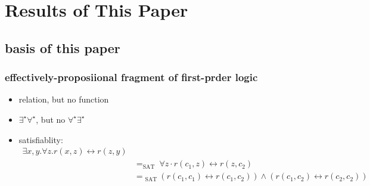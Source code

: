\section{Results of This Paper}
\subsection{basis of this paper}
\begin{frame}
    \frametitle{effectively-proposiional fragment of first-prder logic}
    \begin{itemize}
        \item relation, but no function
        \item $\exists^{\star} \forall ^{\star}$, but no $\forall^{\star} \exists ^{\star}$
        \item satisfiablity:
        \begin{align}
            \exists x, y . \forall z . r(x, z) \leftrightarrow r(z, y) \\ & = _{\text {SAT }} \forall z \cdot r\left(c_{1}, z\right) \leftrightarrow r\left(z, c_{2}\right) \\ & = { }_{\text {SAT }}\left(r\left(c_{1}, c_{1}\right) \leftrightarrow r\left(c_{1}, c_{2}\right)\right) \wedge\left(r\left(c_{1}, c_{2}\right) \leftrightarrow r\left(c_{2}, c_{2}\right)\right)
        \end{align}
    \end{itemize}
\end{frame}